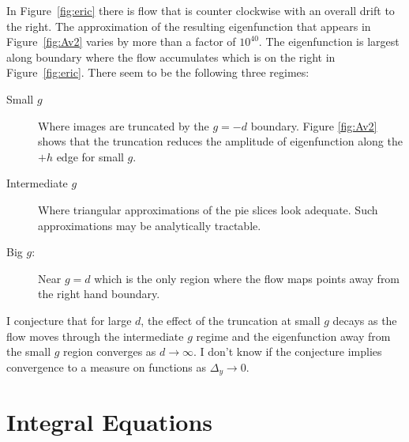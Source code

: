 \documentclass[twocolumn]{article}
\begin{document}
In Figure~\ref{fig:eric} there is flow that is counter clockwise with
an overall drift to the right.  The approximation of the resulting
eigenfunction that appears in Figure~\ref{fig:Av2} varies by more than
a factor of $10^{40}$.  The eigenfunction is largest along boundary
where the flow accumulates which is on the right in
Figure~\ref{fig:eric}.  There seem to be the following three regimes:
\begin{description}
\item[Small $g$] Where images are truncated by the $g=-d$ boundary.
  Figure \ref{fig:Av2} shows that the truncation reduces the amplitude
  of eigenfunction along the $+h$ edge for small $g$.
\item[Intermediate $g$] Where triangular approximations of the pie
  slices look adequate.  Such approximations may be analytically tractable.
\item[Big $g$:] Near $g=d$ which is the only region where the flow
  maps points away from the right hand boundary.
\end{description}
I conjecture that for large $d$, the effect of the truncation at small
$g$ decays as the flow moves through the intermediate $g$ regime and
the eigenfunction away from the small $g$ region converges as
$d\rightarrow \infty$.  I don't know if the conjecture implies
convergence to a measure on functions as $\Delta_y \rightarrow 0$.

\section{Integral Equations}
\label{sec:integral-equations}
\end{document}
